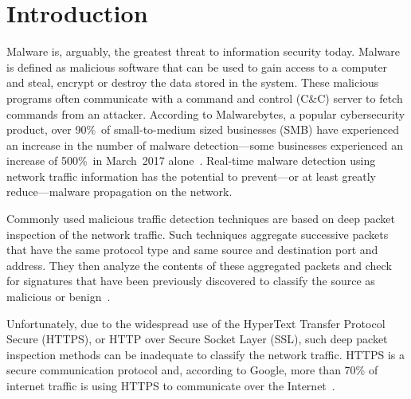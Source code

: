 \chapter{Introduction\label{chap:intro}}

Malware is, arguably, the greatest threat to information security today. Malware is defined as malicious software that can be used to gain access to a computer and steal, encrypt or destroy the data stored in the system. These malicious programs often communicate with a command and control (C\&C) server to fetch commands from an attacker. According to Malwarebytes, a popular cybersecurity product, over 90\%\ of small-to-medium sized businesses (SMB) have experienced an increase in the number of malware detection---some businesses experienced an increase of 500\%\  in
 March~2017 alone~\cite{Malwarebytes17}. Real-time malware detection using network traffic information has the potential to prevent---or at least greatly reduce---malware propagation on the network.

Commonly used malicious traffic detection techniques are based on deep packet inspection of the network traffic. 
Such techniques aggregate successive packets that have the same protocol type and same source and destination port and address. They then analyze the contents of these aggregated packets and check for signatures that have been 
previously discovered to classify the source as malicious or benign~\cite{SenSW04}.

Unfortunately, due to the widespread use of the HyperText Transfer Protocol Secure (HTTPS), or HTTP over Secure Socket Layer (SSL), such deep packet inspection methods can be inadequate to classify the network traffic. HTTPS is a secure communication protocol and, according to Google, more than 70\% of internet traffic is using HTTPS to communicate over the Internet~\cite{Google17}. 

